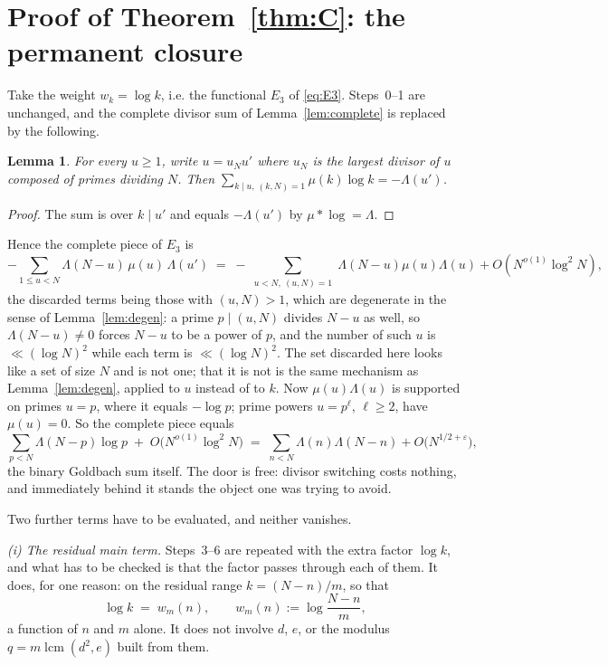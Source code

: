 \documentclass[11pt,a4paper]{article}
\theoremstyle{plain}
\newtheorem{lemma}[theorem]{Lemma}
\theoremstyle{definition}
\theoremstyle{remark}
\DeclareMathOperator{\lcm}{lcm}
\begin{document}
\section{Proof of \texorpdfstring{Theorem~\ref{thm:C}}{the identity}:
the permanent closure}%
\label{sec:C}

Take the weight $w_k=\log k$, i.e. the functional $E_3$ of
\eqref{eq:E3}. Steps~0--1 are unchanged, and the complete divisor sum
of Lemma~\ref{lem:complete} is replaced by the following.

\begin{lemma}\label{lem:completelog}
For every $u\ge1$, write $u=u_Nu'$ where $u_N$ is the largest divisor
of $u$ composed of primes dividing $N$. Then
$\sum_{k\mid u,\ (k,N)=1}\mu(k)\log k=-\Lambda(u')$.
\end{lemma}

\begin{proof}
The sum is over $k\mid u'$ and equals $-\Lambda(u')$ by
$\mu*\log=\Lambda$.
\end{proof}

Hence the complete piece of $E_3$ is
\[
  -\sum_{1\le u<N}\Lambda(N-u)\,\mu(u)\,\Lambda(u')
  \;=\;-\sum_{\substack{u<N,\ (u,N)=1}}\Lambda(N-u)\mu(u)\Lambda(u)
        +O(N^{o(1)}\log^2 N),
\]
the discarded terms being those with $(u,N)>1$, which are degenerate in
the sense of Lemma~\ref{lem:degen}: a prime $p\mid(u,N)$ divides $N-u$
as well, so $\Lambda(N-u)\ne0$ forces $N-u$ to be a power of $p$, and
the number of such $u$ is $\ll(\log N)^2$ while each term is
$\ll(\log N)^2$. The set discarded here looks like a set of size $N$
and is not one; that it is not is the same mechanism as
Lemma~\ref{lem:degen}, applied to $u$ instead of to $k$.
Now $\mu(u)\Lambda(u)$ is supported on primes $u=p$, where it equals
$-\log p$; prime powers $u=p^\ell$, $\ell\ge2$, have $\mu(u)=0$. So
the complete piece equals
\begin{equation}\label{eq:goldbachback}
  \sum_{p<N}\Lambda(N-p)\log p\;+\;O\bigl(N^{o(1)}\log^2N\bigr)
  \;=\;\sum_{n<N}\Lambda(n)\Lambda(N-n)+O\bigl(N^{1/2+\varepsilon}\bigr),
\end{equation}
the binary Goldbach sum itself. The door is free: divisor switching
costs nothing, and immediately behind it stands the object one was
trying to avoid.

Two further terms have to be evaluated, and neither vanishes.

\medskip\noindent
\emph{(i) The residual main term.} Steps~3--6 are repeated with the
extra factor $\log k$, and what has to be checked is that the factor
passes through each of them. It does, for one reason: on the residual
range $k=(N-n)/m$, so that
\begin{equation}\label{eq:logweight}
  \log k\;=\;w_m(n),\qquad w_m(n):=\log\frac{N-n}{m},
\end{equation}
a function of $n$ and $m$ alone. It does not involve $d$, $e$, or the
modulus $q=m\lcm(d^2,e)$ built from them.
\end{document}
